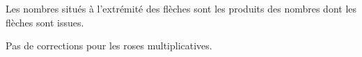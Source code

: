\numeroteEnigme
\begin{enigme}
    Les nombres situés à l'extrémité des flèches sont les produits des nombres dont les flèches sont issues.     

    \begin{minipage}{0.5\linewidth}
        \begin{center}
            \RoseMul[Aide,Rayon=18mm]
        \end{center}
    \end{minipage}
    \hfill
    \begin{minipage}{0.5\linewidth}
        \begin{center}
            \RoseMul[Aide,Produits,Rayon=18mm]
        \end{center}
    \end{minipage}  
    
\end{enigme}

\addtocounter{exercice}{-1}
\begin{corrige}
    Pas de corrections pour les roses multiplicatives.

\end{corrige}